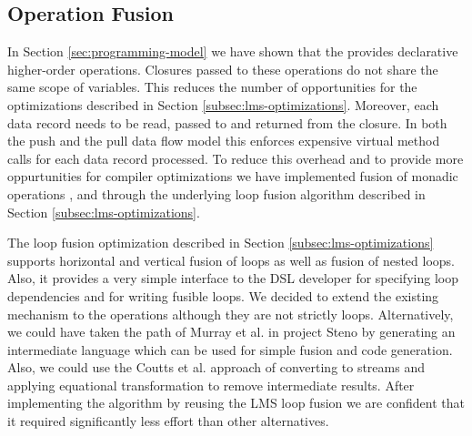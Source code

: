 \subsection{Operation Fusion}
\label{sec:fusion}

In Section \ref{sec:programming-model} we have shown that the 
provides declarative higher-order operations. Closures passed to these
operations do not share the same scope of variables. This reduces the number of
opportunities for the optimizations described in Section
\ref{subsec:lms-optimizations}. Moreover, each data record needs to be read,
passed to and returned from the closure. In both the push and the pull data flow
model this enforces expensive virtual method calls \cite{murray_steno:_2011} for
each data record processed. To reduce this overhead and to provide more
oppurtunities for compiler optimizations we have implemented fusion of monadic
operations ,  and  through the underlying
loop fusion algorithm described in Section \ref{subsec:lms-optimizations}.

The loop fusion optimization described in Section \ref{subsec:lms-optimizations}
supports horizontal and vertical fusion of loops as well as fusion of nested
loops. Also, it provides a very simple interface to the DSL developer for
specifying loop dependencies and for writing fusible loops. We decided to extend
the existing mechanism to the  operations although they are not
strictly loops. Alternatively, we could have taken the path of Murray et al. in
project Steno \cite{murray_steno:_2011} by generating an intermediate language which can be
used for simple fusion and code generation. Also, we could use the Coutts et al.
\cite{coutts_stream_2007} approach of converting  to streams and
applying equational transformation to remove intermediate results. After
implementing the algorithm by reusing the LMS loop fusion we are confident that
it required significantly less effort than other alternatives.


